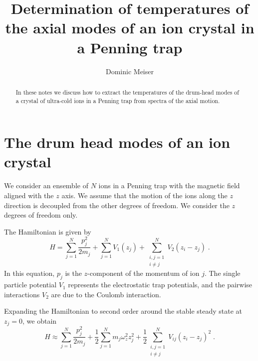 \documentclass[aps, pra, preprint]{revtex4-1}
\begin{document}
\title{Determination of temperatures of the axial modes of an ion
  crystal in a Penning trap}
\author{Dominic Meiser}

\begin{abstract}
  In these notes we discuss how to extract the temperatures of
  the drum-head modes of a crystal of ultra-cold ions in a
  Penning trap from spectra of the axial motion.
\end{abstract}

\maketitle


\section{The drum head modes of an ion crystal}

We consider an ensemble of $N$ ions in a Penning trap with the
magnetic field aligned with the $z$ axis. We assume that the
motion of the ions along the $z$ direction is decoupled from the
other degrees of freedom. We consider the $z$ degrees of
freedom only.

The Hamiltonian is given by
\begin{equation}
  H=
    \sum_{j=1}^N\frac{p_j^2}{2m_j} +
    \sum_{j=1}^NV_1(z_j) +
    \sum_{\substack{i,j = 1\\i\neq j}}^{N}V_2(z_i - z_j)\;.
\end{equation}
In this equation, $p_j$ is the $z$-component of the momentum of
ion $j$. The single particle potential $V_1$ represents the
electrostatic trap potentials, and the pairwise interactions
$V_2$ are due to the Coulomb interaction. 

Expanding the Hamiltonian to second order around the stable
steady state at $z_j=0$, we obtain
\begin{equation}
  H\approx 
    \sum_{j=1}^N \frac{p_j^2}{2m_j} +
    \frac{1}{2}\sum_{j=1}^N m_j \omega_z^2 z_j^2+
    \frac{1}{2}\sum_{\substack{i,j = 1\\i\neq j}}^{N} V_{ij}(z_i-z_j)^2\;.
\end{equation}
\end{document}
